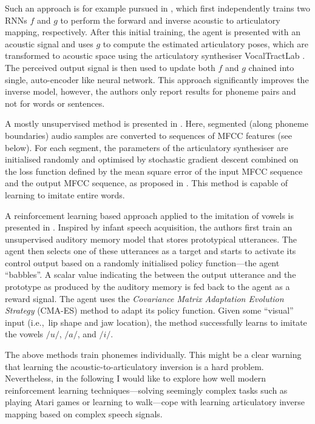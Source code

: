 \documentclass[letterpaper,10pt,conference]{ieeeconf}
\begin{document}
Such an approach is for example pursued in \cite{philippsen2014learning}, which first independently trains two RNNs $f$ and $g$ to perform the forward and inverse acoustic to articulatory mapping, respectively. After this initial training, the agent is presented with an acoustic signal and uses $g$ to compute the estimated articulatory poses, which are transformed to acoustic space using the articulatory synthesiser VocalTractLab \cite{birkholz2017vocaltractlab}. The perceived output signal is then used to update both $f$ and $g$ chained into single, auto-encoder like neural network. This approach significantly improves the inverse model, however, the authors only report results for phoneme pairs and not for words or sentences.

A mostly unsupervised method is presented in \cite{prom-on2013training}. Here, segmented (along phoneme boundaries) audio samples are converted to sequences of MFCC features (see below). For each segment, the parameters of the articulatory synthesiser are initialised randomly and optimised by stochastic gradient descent combined on the loss function defined by the mean square error of the input MFCC sequence and the output MFCC sequence, as proposed in \cite{mermelstein1976distance}. This method is capable of learning to imitate entire words.

A reinforcement learning based approach applied to the imitation of vowels is presented in \cite{murakami2015seeing}. Inspired by infant speech acquisition, the authors first train an unsupervised auditory memory model that stores prototypical utterances. The agent then selects one of these utterances as a target and starts to activate its control output based on a randomly initialised policy function---the agent \enquote{babbles}. A scalar value indicating the between the output utterance and the prototype as produced by the auditory memory is fed back to the agent as a reward signal. The agent uses the \emph{Covariance Matrix Adaptation Evolution Strategy} (CMA-ES) method to adapt its policy function. Given some \enquote{visual} input (i.e.,~lip shape and jaw location), the method successfully learns to imitate the vowels $/u/$, $/a/$, and $/i/$.

The above methods train phonemes individually. This might be a clear warning that learning the acoustic-to-articulatory inversion is a hard problem. Nevertheless, in the following I would like to explore how well modern reinforcement learning techniques---solving seemingly complex tasks such as playing Atari games or learning to walk---cope with learning articulatory inverse mapping based on complex speech signals.
\end{document}

